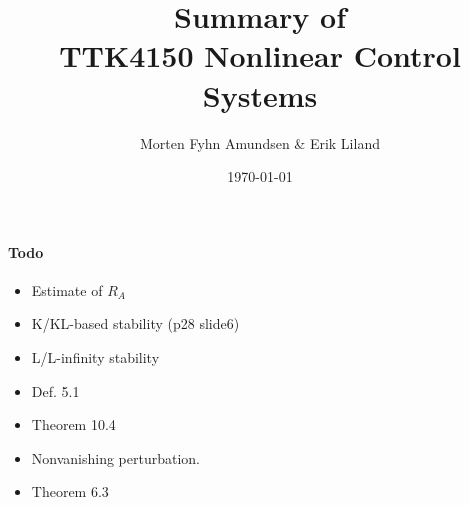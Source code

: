 \documentclass[a4paper,12pt]{article}
\title{Summary of\\TTK4150 Nonlinear Control Systems}
\author{Morten Fyhn Amundsen \& Erik Liland}
\date{\today}
\begin{document}
\maketitle
\tableofcontents

\paragraph{Todo}
\begin{itemize}
	\item Estimate of $R_A$
	\item K/KL-based stability (p28 slide6)
	\item L/L-infinity stability
	\item Def. 5.1
	\item Theorem 10.4
	\item Nonvanishing perturbation.
	\item Theorem 6.3
\end{itemize}

\end{document}
